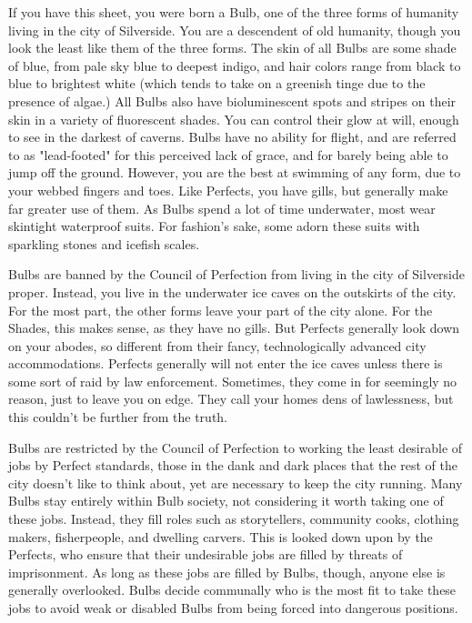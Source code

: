 \documentclass[blue]{Silversiders}
\begin{document}
\name{\bBulbs{}}

If you have this sheet, you were born a Bulb, one of the three forms of humanity living in the city of Silverside. You are a descendent of old humanity, though you look the least like them of the three forms. The skin of all Bulbs are some shade of blue, from pale sky blue to deepest indigo, and hair colors range from black to blue to brightest white (which tends to take on a greenish tinge due to the presence of algae.) All Bulbs also have bioluminescent spots and stripes on their skin in a variety of fluorescent shades. You can control their glow at will, enough to see in the darkest of caverns. Bulbs have no ability for flight, and are referred to as "lead-footed" for this perceived lack of grace, and for barely being able to jump off the ground. However, you are the best at swimming of any form, due to your webbed fingers and toes. Like Perfects, you have gills, but generally make far greater use of them. As Bulbs spend a lot of time underwater, most wear skintight waterproof suits. For fashion's sake, some adorn these suits with sparkling stones and icefish scales.

Bulbs are banned by the Council of Perfection from living in the city of Silverside proper. Instead, you live in the underwater ice caves on the outskirts of the city. For the most part, the other forms leave your part of the city alone. For the Shades, this makes sense, as they have no gills. But Perfects generally look down on your abodes, so different from their fancy, technologically advanced city accommodations. Perfects generally will not enter the ice caves unless there is some sort of raid by law enforcement. Sometimes, they come in for seemingly no reason, just to leave you on edge. They call your homes dens of lawlessness, but this couldn't be further from the truth.

Bulbs are restricted by the Council of Perfection to working the least desirable of jobs by Perfect standards, those in the dank and dark places that the rest of the city doesn't like to think about, yet are necessary to keep the city running. Many Bulbs stay entirely within Bulb society, not considering it worth taking one of these jobs. Instead, they fill roles such as storytellers, community cooks, clothing makers, fisherpeople, and dwelling carvers. This is looked down upon by the Perfects, who ensure that their undesirable jobs are filled by threats of imprisonment. As long as these jobs are filled by Bulbs, though, anyone else is generally overlooked. Bulbs decide communally who is the most fit to take these jobs to avoid weak or disabled Bulbs from being forced into dangerous positions.
\end{document}
